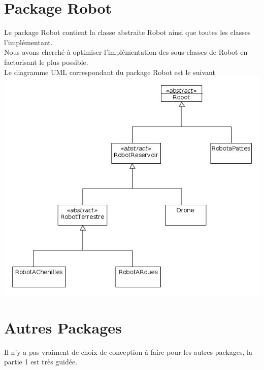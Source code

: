 \documentclass[
  oneside,
  11pt, a4paper,
  footinclude=true,
  headinclude=true,
  cleardoublepage=empty
]{scrbook}
\begin{document}
\section{Package Robot}
Le package Robot contient la classe abstraite Robot ainsi que toutes les classes l'implémentant. \\ 

Nous avons cherché à optimiser l'implémentation des sous-classes de Robot en factorisant le plus possible. \\ 



Le diagramme UML correspondant du package Robot est le suivant \\

\includegraphics[scale=0.5]{./UML-Robot.jpg}


\section{Autres Packages}
Il n'y a pas vraiment de choix de conception à faire pour les autres packages, la partie 1 est très guidée. 
\end{document}
